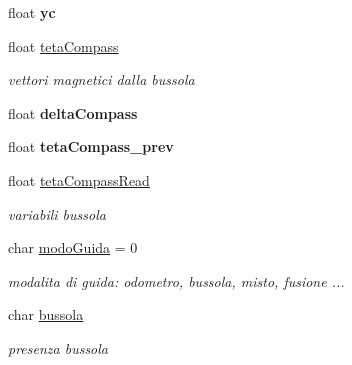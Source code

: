 \begin{DoxyCompactItemize}
\mbox{\label{ari_pi__2_d_c__esp__08_8ino_abc8f2957d7ee72cfb3e2af9bdfc27018}} 
float {\bfseries yc}
\item 
\mbox{\label{ari_pi__2_d_c__esp__08_8ino_a87efb8e08c2adbc437cc67078d6a55fc}} 
float \mbox{\hyperlink{ari_pi__2_d_c__esp__08_8ino_a87efb8e08c2adbc437cc67078d6a55fc}{teta\+Compass}}
\begin{DoxyCompactList}\small\item\em vettori magnetici dalla bussola \end{DoxyCompactList}\item 
\mbox{\label{ari_pi__2_d_c__esp__08_8ino_affc72d7637b810bd21ce037f035b6e0a}} 
float {\bfseries delta\+Compass}
\item 
\mbox{\label{ari_pi__2_d_c__esp__08_8ino_aab8609ee95cbabd2ffeaf176b9fac768}} 
float {\bfseries teta\+Compass\+\_\+prev}
\item 
\mbox{\label{ari_pi__2_d_c__esp__08_8ino_afae537763d72e1c7aa5bddabb567ee76}} 
float \mbox{\hyperlink{ari_pi__2_d_c__esp__08_8ino_afae537763d72e1c7aa5bddabb567ee76}{teta\+Compass\+Read}}
\begin{DoxyCompactList}\small\item\em variabili bussola \end{DoxyCompactList}\item 
\mbox{\label{ari_pi__2_d_c__esp__08_8ino_a0a2c5b7e5415d49d86d1c9a388128712}} 
char \mbox{\hyperlink{ari_pi__2_d_c__esp__08_8ino_a0a2c5b7e5415d49d86d1c9a388128712}{modo\+Guida}} = 0
\begin{DoxyCompactList}\small\item\em modalita\textquotesingle{} di guida\+: odometro, bussola, misto, fusione ... \end{DoxyCompactList}\item 
\mbox{\label{ari_pi__2_d_c__esp__08_8ino_a738a053ee840162d6a9646fe09f00ea8}} 
char \mbox{\hyperlink{ari_pi__2_d_c__esp__08_8ino_a738a053ee840162d6a9646fe09f00ea8}{bussola}}
\begin{DoxyCompactList}\small\item\em presenza bussola \end{DoxyCompactList}\item 

\end{DoxyCompactItemize}
